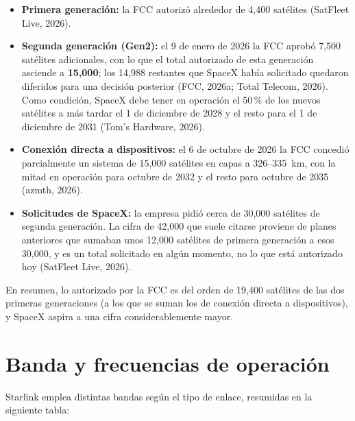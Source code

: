 \documentclass[12pt,letterpaper]{article}
\begin{document}
\begin{itemize}[nosep]
    \item \textbf{Primera generación:} la FCC autorizó alrededor de 4,400 satélites (SatFleet Live, 2026).
    \item \textbf{Segunda generación (Gen2):} el 9 de enero de 2026 la FCC aprobó 7,500 satélites adicionales, con lo que el total autorizado de esta generación asciende a \textbf{15,000}; los 14,988 restantes que SpaceX había solicitado quedaron diferidos para una decisión posterior (FCC, 2026a; Total Telecom, 2026). Como condición, SpaceX debe tener en operación el 50\,\% de los nuevos satélites a más tardar el 1 de diciembre de 2028 y el resto para el 1 de diciembre de 2031 (Tom's Hardware, 2026).
    \item \textbf{Conexión directa a dispositivos:} el 6 de octubre de 2026 la FCC concedió parcialmente un sistema de 15,000 satélites en capas a 326--335~km, con la mitad en operación para octubre de 2032 y el resto para octubre de 2035 (azmth, 2026).
    \item \textbf{Solicitudes de SpaceX:} la empresa pidió cerca de 30,000 satélites de segunda generación. La cifra de 42,000 que suele citarse proviene de planes anteriores que sumaban unos 12,000 satélites de primera generación a esos 30,000, y es un total solicitado en algún momento, no lo que está autorizado hoy (SatFleet Live, 2026).
\end{itemize}

En resumen, lo autorizado por la FCC es del orden de 19,400 satélites de las dos primeras generaciones (a los que se suman los de conexión directa a dispositivos), y SpaceX aspira a una cifra considerablemente mayor.

\section{Banda y frecuencias de operación}

Starlink emplea distintas bandas según el tipo de enlace, resumidas en la siguiente tabla:
\end{document}
